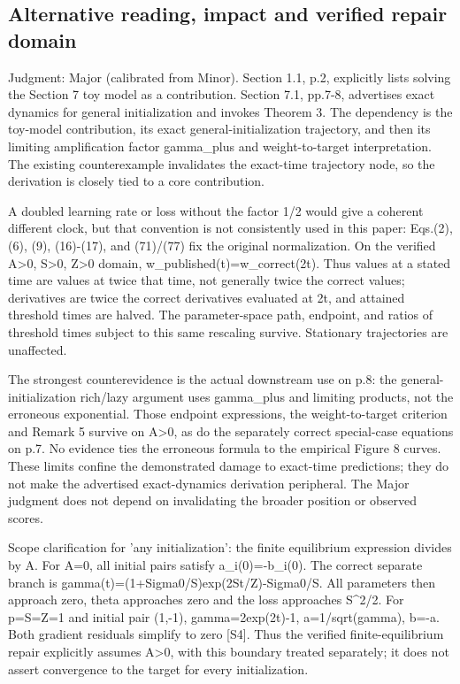 \documentclass[10pt]{article}
\begin{document}
\subsection*{Alternative reading, impact and verified repair domain}
Judgment: Major (calibrated from Minor). Section 1.1, p.2, explicitly lists solving the Section 7 toy model as a contribution. Section 7.1, pp.7-8, advertises exact dynamics for general initialization and invokes Theorem 3. The dependency is the toy-model contribution, its exact general-initialization trajectory, and then its limiting amplification factor gamma\_plus and weight-to-target interpretation. The existing counterexample invalidates the exact-time trajectory node, so the derivation is closely tied to a core contribution.\par
A doubled learning rate or loss without the factor 1/2 would give a coherent different clock, but that convention is not consistently used in this paper: Eqs.(2), (6), (9), (16)-(17), and (71)/(77) fix the original normalization. On the verified A>0, S>0, Z>0 domain, w\_published(t)=w\_correct(2t). Thus values at a stated time are values at twice that time, not generally twice the correct values; derivatives are twice the correct derivatives evaluated at 2t, and attained threshold times are halved. The parameter-space path, endpoint, and ratios of threshold times subject to this same rescaling survive. Stationary trajectories are unaffected.\par
The strongest counterevidence is the actual downstream use on p.8: the general-initialization rich/lazy argument uses gamma\_plus and limiting products, not the erroneous exponential. Those endpoint expressions, the weight-to-target criterion and Remark 5 survive on A>0, as do the separately correct special-case equations on p.7. No evidence ties the erroneous formula to the empirical Figure 8 curves. These limits confine the demonstrated damage to exact-time predictions; they do not make the advertised exact-dynamics derivation peripheral. The Major judgment does not depend on invalidating the broader position or observed scores.\par
Scope clarification for ’any initialization’: the finite equilibrium expression divides by A. For A=0, all initial pairs satisfy a\_i(0)=-b\_i(0). The correct separate branch is gamma(t)=(1+Sigma0/S)exp(2St/Z)-Sigma0/S. All parameters then approach zero, theta approaches zero and the loss approaches S\textasciicircum{}2/2. For p=S=Z=1 and initial pair (1,-1), gamma=2exp(2t)-1, a=1/sqrt(gamma), b=-a. Both gradient residuals simplify to zero [S4]. Thus the verified finite-equilibrium repair explicitly assumes A>0, with this boundary treated separately; it does not assert convergence to the target for every initialization.\par
\end{document}
